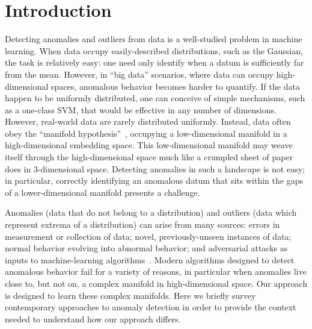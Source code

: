 \section{Introduction}
\label{sec:introduction}

Detecting anomalies and outliers from data is a well-studied problem in machine learning.
When data occupy easily-described distributions, such as the Gaussian, the task is relatively easy: one need only identify when a datum is sufficiently far from the mean.
However, in ``big data'' scenarios, where data can occupy high-dimensional spaces, anomalous behavior becomes harder to quantify.
If the data happen to be uniformly distributed, one can conceive of simple mechanisms, such as a one-class SVM, that would be effective in any number of dimensions.
However, real-world data are rarely distributed uniformly.
Instead, data often obey the ``manifold hypothesis''~\cite{fefferman2016testing}, occupying a low-dimensional manifold in a high-dimensional embedding space.
This low-dimensional manifold may weave itself through the high-dimensional space much like a crumpled sheet of paper does in 3-dimensional space.
Detecting anomalies in such a landscape is not easy;
in particular, correctly identifying an anomalous datum that sits within the gaps of a lower-dimensional manifold presents a challenge.

Anomalies (data that do not belong to a distribution) and outliers (data which represent extrema of a distribution) can arise from many sources:
errors in measurement or collection of data;
novel, previously-unseen instances of data;
normal behavior evolving into abnormal behavior;
and adversarial attacks as inputs to machine-learning algorithms~\cite{elsayed2018adversarial}.
Modern algorithms designed to detect anomalous behavior fail for a variety of reasons, in particular when anomalies live close to, but not on, a complex manifold in high-dimensional space.
Our approach is designed to learn these complex manifolds.
Here we briefly survey contemporary approaches to anomaly detection in order to provide the context needed to understand how our approach differs.
